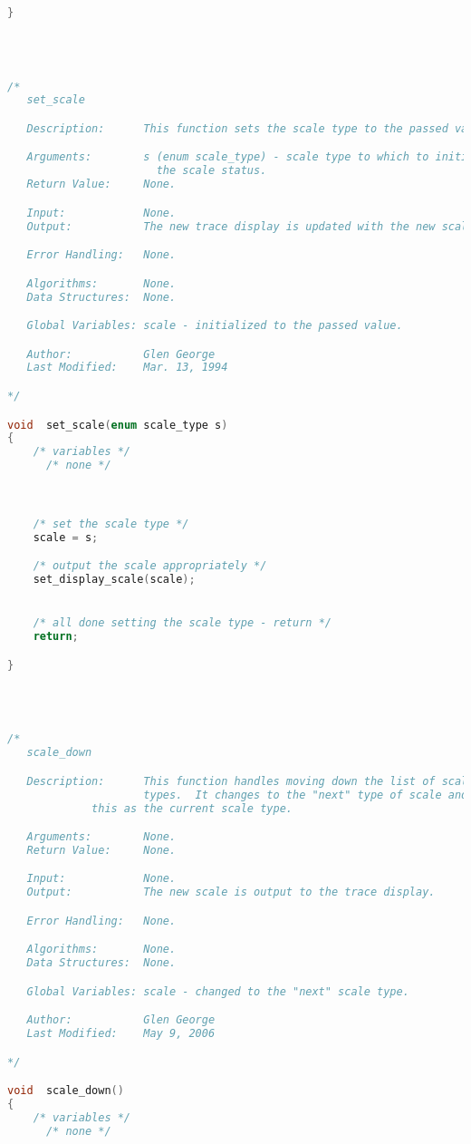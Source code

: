 \begin{lstlisting}[language=C]
}




/*
   set_scale

   Description:      This function sets the scale type to the passed value.

   Arguments:        s (enum scale_type) - scale type to which to initialize
   					   the scale status.
   Return Value:     None.

   Input:            None.
   Output:           The new trace display is updated with the new scale.

   Error Handling:   None.

   Algorithms:       None.
   Data Structures:  None.

   Global Variables: scale - initialized to the passed value.

   Author:           Glen George
   Last Modified:    Mar. 13, 1994

*/

void  set_scale(enum scale_type s)
{
    /* variables */
      /* none */



    /* set the scale type */
    scale = s;

    /* output the scale appropriately */
    set_display_scale(scale);


    /* all done setting the scale type - return */
    return;

}




/*
   scale_down

   Description:      This function handles moving down the list of scale
                     types.  It changes to the "next" type of scale and sets
   		     this as the current scale type.

   Arguments:        None.
   Return Value:     None.

   Input:            None.
   Output:           The new scale is output to the trace display.

   Error Handling:   None.

   Algorithms:       None.
   Data Structures:  None.

   Global Variables: scale - changed to the "next" scale type.

   Author:           Glen George
   Last Modified:    May 9, 2006

*/

void  scale_down()
{
    /* variables */
      /* none */




\end{lstlisting}
